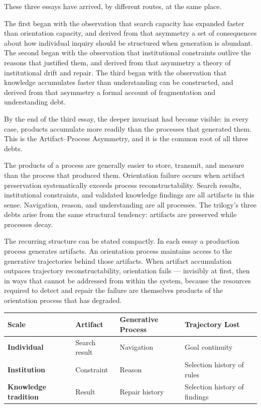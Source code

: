 

These three essays have arrived, by different routes, at the same place.

The first began with the observation that search capacity has expanded faster
than orientation capacity, and derived from that asymmetry a set of consequences
about how individual inquiry should be structured when generation is abundant.
The second began with the observation that institutional constraints outlive
the reasons that justified them, and derived from that asymmetry a theory of
institutional drift and repair. The third began with the observation that
knowledge accumulates faster than understanding can be constructed, and derived
from that asymmetry a formal account of fragmentation and understanding debt.

By the end of the third essay, the deeper invariant had become visible: in
every case, products accumulate more readily than the processes that generated
them. This is the Artifact--Process Asymmetry, and it is the common root of
all three debts.

\begin{principle}
The products of a process are generally easier to store, transmit, and
measure than the process that produced them. Orientation failure occurs when
artifact preservation systematically exceeds process reconstructability.
Search results, institutional constraints, and validated knowledge findings
are all artifacts in this sense. Navigation, reason, and understanding are
all processes. The trilogy's three debts arise from the same structural
tendency: artifacts are preserved while processes decay.
\end{principle}

The recurring structure can be stated compactly. In each essay a production
process generates artifacts. An orientation process maintains access to the
generative trajectories behind those artifacts. When artifact accumulation
outpaces trajectory reconstructability, orientation fails --- invisibly at
first, then in ways that cannot be addressed from within the system, because
the resources required to detect and repair the failure are themselves products
of the orientation process that has degraded.

\bigskip
\begin{center}
\begin{tabular}{>{\bfseries}p{2.8cm} p{2.8cm} p{3cm} p{3.6cm}}
\toprule
Scale & Artifact & Generative Process & Trajectory Lost \\
\midrule
Individual & Search result & Navigation & Goal continuity \\[0.3em]
Institution & Constraint & Reason & Selection history of rules \\[0.3em]
Knowledge tradition & Result & Repair history & Selection history of findings \\
\bottomrule
\end{tabular}
\end{center}
\bigskip

